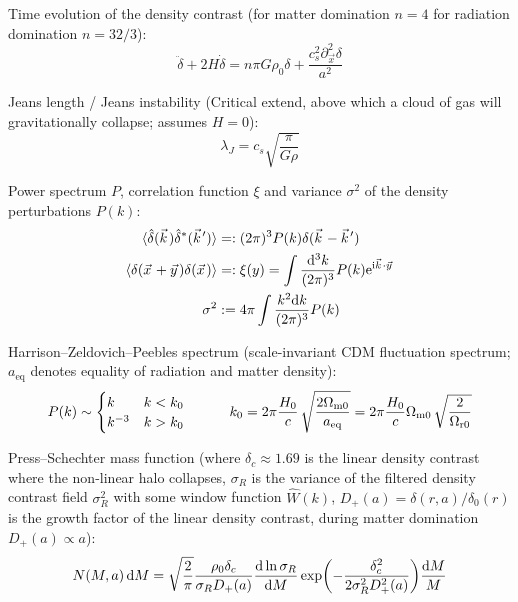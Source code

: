 		\noindent
		Time evolution of the density contrast (for matter domination $n=4$ for radiation domination $n=32/3$):
		\begin{equation}
			\ddot{\delta} + 2 H \dot{\delta} = n \pi G \rho_0 \delta + \frac{c_s^2 \partial_{\vec{x}}^2 \delta}{a^2}
		\end{equation}

		\noindent
		Jeans length / Jeans instability (Critical extend, above which a cloud of gas will gravitationally collapse; assumes $H=0$):
		\begin{equation}
			\lambda_J = c_s \sqrt{\frac{\pi}{G \rho}}
		\end{equation}

		\noindent
		Power spectrum $P$, correlation function $\xi$ and variance $\sigma^2$ of the density perturbations $P(k)$:
		\begin{align}
			\avg{\hat{\delta}(\vec{k}) \hat{\delta}^{*}(\vec{k}')} &=: (2\pi)^3 P(k) \delta (\vec{k}-\vec{k}') \\
			\avg{\delta(\vec{x} + \vec{y}) \delta(\vec{x})} &=: \xi(y) = \int \frac{\dd[3]k}{(2\pi)^3} P(k) \ex^{\i \vec{k} \cdot \vec{y}}\\
			\sigma^2 &:= 4\pi\int \frac{k^2 \dd k}{(2 \pi)^3} P(k)
		\end{align}

		\noindent
		Harrison--Zeldovich--Peebles spectrum (scale-invariant CDM fluctuation spectrum; $a_{\text{eq}}$ denotes equality of radiation and matter density):
		\begin{equation}
			P(k) \sim
			\begin{cases}
				k & k < k_0\\
				k^{-3} & k > k_0
			\end{cases}
			\hspace{30pt}
			k_0 = 2\pi{\frac{H_{0}}{c}}\,{\sqrt{\frac{2\Omega_{\mathrm{m0}}}{a_{\mathrm{eq}}}}}=2\pi{\frac{H_{0}}{c}}\Omega_{\mathrm{m0}}\,{\sqrt{\frac{2}{\Omega_{\mathrm{r0}}}}}
		\end{equation}

		\noindent
		Press--Schechter mass function (where $\delta_c \approx 1.69$ is the linear density contrast where the non-linear halo collapses, $\sigma_R$ is the variance of the filtered density contrast field $\sigma_R^2$ with some window function $\hat{W}(k)$, $D_+(a) = \delta(r,a)/\delta_0(r)$ is the growth factor of the linear density contrast, during matter domination $D_+(a) \propto a$):
		\begin{equation}
			N(M,a) \dd{M} = \sqrt{\frac{2}{\pi}} \frac{\rho_0 \delta_c}{\sigma_R D_{+}(a)} \dv{\ln\sigma_R}{M} \exp(-\frac{\delta_c^2}{2 \sigma_R^2 D_{+}^2(a)}) \frac{\dd M}{M}
		\end{equation}

